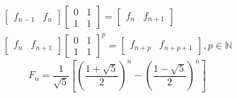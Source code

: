 \[
      \begin{array}{l}
            \begin{bmatrix} f_{n-1} & f_n \end{bmatrix}
            \begin{bmatrix} 0 & 1 \\ 1 & 1 \end{bmatrix} =
            \begin{bmatrix} f_n & f_{n+1} \end{bmatrix} \\
            \begin{bmatrix} f_n & f_{n+1} \end{bmatrix}
            {\begin{bmatrix} 0 & 1 \\ 1 & 1 \end{bmatrix}}^p =
            \begin{bmatrix} f_{n+p} & f_{n+p+1} \end{bmatrix},
            p \in \mathbb{N}
      \end{array} 
\]
\[
      F_n = \frac{1}{\sqrt{5}} \left [ \left( \frac{1+\sqrt{5}}{2} \right)^n- \left( \frac{1-\sqrt{5}}{2} \right)^n \right ] 
\]